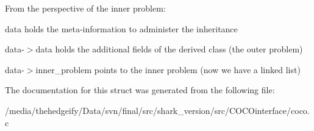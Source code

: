 From the perspective of the inner problem\+:
\begin{DoxyItemize}
\item data holds the meta-\/information to administer the inheritance
\item data-\/$>$data holds the additional fields of the derived class (the outer problem)
\item data-\/$>$inner\+\_\+problem points to the inner problem (now we have a linked list) 
\end{DoxyItemize}

The documentation for this struct was generated from the following file\+:\begin{DoxyCompactItemize}
\item 
/media/thehedgeify/\+Data/svn/final/src/shark\+\_\+version/src/\+C\+O\+C\+Ointerface/coco.\+c\end{DoxyCompactItemize}
